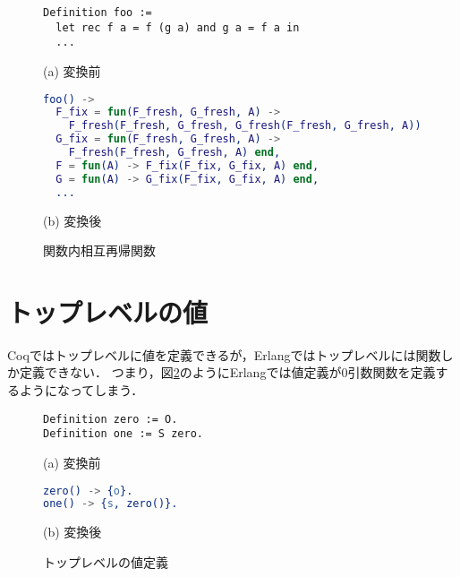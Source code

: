 \begin{figure}\centering
\begin{minipage}{1\textwidth}\centering
\begin{lstlisting}[frame=single,numbers=none,xleftmargin=0pt]
Definition foo :=
  let rec f a = f (g a) and g a = f a in
  ...
\end{lstlisting}
(a) 変換前
\end{minipage}
\begin{minipage}{1\textwidth}\centering
\begin{lstlisting}[frame=single,numbers=none,xleftmargin=0pt,language=Erlang]
foo() ->
  F_fix = fun(F_fresh, G_fresh, A) ->
    F_fresh(F_fresh, G_fresh, G_fresh(F_fresh, G_fresh, A)) end,
  G_fix = fun(F_fresh, G_fresh, A) ->
    F_fresh(F_fresh, G_fresh, A) end,
  F = fun(A) -> F_fix(F_fix, G_fix, A) end,
  G = fun(A) -> G_fix(F_fix, G_fix, A) end,
  ...
\end{lstlisting}
(b) 変換後
\end{minipage}
\caption{関数内相互再帰関数}\label{code:extraction:recursive}
\end{figure}

\section{トップレベルの値}

Coqではトップレベルに値を定義できるが，Erlangではトップレベルには関数しか定義できない．
つまり，図\ref{code:extraction:toplevel-value-impossible}のようにErlangでは値定義が0引数関数を定義するようになってしまう．

\begin{figure}\centering
\begin{minipage}{0.4\textwidth}\centering
\begin{lstlisting}[frame=single,numbers=none,xleftmargin=0pt]
Definition zero := O.
Definition one := S zero.
\end{lstlisting}
(a) 変換前
\end{minipage}
\hspace*{3ex}
\begin{minipage}{0.4\textwidth}\centering
\begin{lstlisting}[frame=single,numbers=none,xleftmargin=0pt,language=Erlang]
zero() -> {o}.
one() -> {s, zero()}.
\end{lstlisting}
(b) 変換後
\end{minipage}
\caption{トップレベルの値定義}\label{code:extraction:toplevel-value-impossible}
\end{figure}

